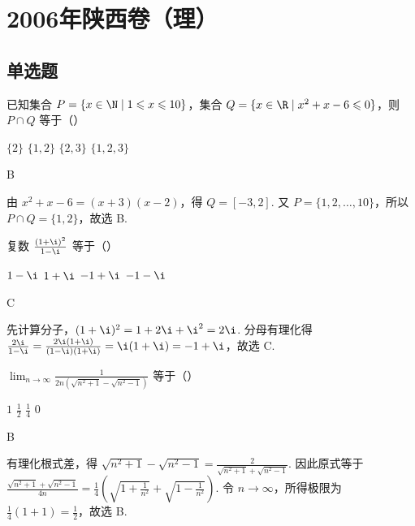 \chapter{2006年陕西卷（理）}
\section{单选题}
\begin{problem}
已知集合 \(P = \{x \in \N \mid 1 \leqslant x \leqslant 10\}\)，集合 \(Q = \{x \in \R \mid x^2 + x - 6 \leqslant 0\}\)，则 \(P \cap Q\) 等于（\quad）

\choices
    {\(\{2\}\)}
    {\(\{1, 2\}\)}
    {\(\{2,3\}\)}
    {\(\{1,2,3\}\)}
\end{problem}

\begin{answer}
B
\end{answer}

\begin{solution}
由 \(x^2+x-6=(x+3)(x-2)\)，得 \(Q=[-3,2]\). 又 \(P=\{1,2,\dots,10\}\)，所以 \(P\cap Q=\{1,2\}\)，故选 B.
\end{solution}

\begin{problem}
复数 \(\frac{(1 + \i)^2}{1 - \i}\) 等于（\quad）

\choices
    {\(1 - \i\)}
    {\(1 + \i\)}
    {\(-1 + \i\)}
    {\(-1 - \i\)}
\end{problem}

\begin{answer}
C
\end{answer}

\begin{solution}
先计算分子，\((1+\i)^2=1+2\i+\i^2=2\i\). 分母有理化得 \(\frac{2\i}{1-\i}=\frac{2\i(1+\i)}{(1-\i)(1+\i)}=\i(1+\i)=-1+\i\)，故选 C.
\end{solution}

\begin{problem}
\(\displaystyle\lim_{n\to \infty}\frac{1}{2n(\sqrt{n^2 + 1} - \sqrt{n^2 - 1})}\) 等于（\quad）

\choices
    {\(1\)}
    {\(\frac{1}{2}\)}
    {\(\frac{1}{4}\)}
    {\(0\)}
\end{problem}

\begin{answer}
B
\end{answer}

\begin{solution}
有理化根式差，得 \(\sqrt{n^2+1}-\sqrt{n^2-1}=\frac{2}{\sqrt{n^2+1}+\sqrt{n^2-1}}\). 因此原式等于 \(\frac{\sqrt{n^2+1}+\sqrt{n^2-1}}{4n}=\frac{1}{4}\left(\sqrt{1+\frac{1}{n^2}}+\sqrt{1-\frac{1}{n^2}}\right)\). 令 \(n\to\infty\)，所得极限为 \(\frac14(1+1)=\frac12\)，故选 B.
\end{solution}

